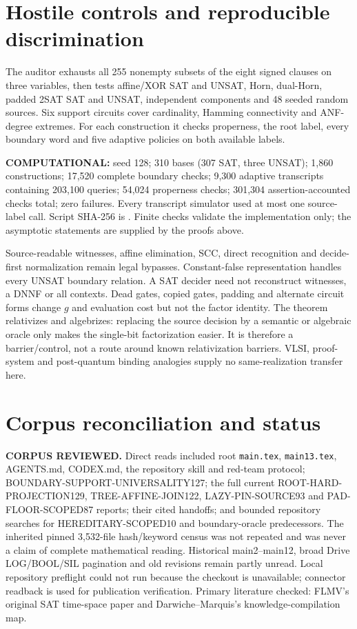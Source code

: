 \documentclass[11pt]{article}
\begin{document}
\section{Hostile controls and reproducible discrimination}
The auditor exhausts all 255 nonempty subsets of the eight signed clauses on
three variables, then tests affine/XOR SAT and UNSAT, Horn, dual-Horn,
padded 2SAT SAT and UNSAT, independent components and 48 seeded random
sources.  Six support circuits cover cardinality, Hamming connectivity and
ANF-degree extremes.  For each construction it checks properness, the root
label, every boundary word and five adaptive policies on both available
labels.

\textbf{COMPUTATIONAL:} seed 128; 310 bases (307 SAT, three UNSAT); 1,860
constructions; 17,520 complete boundary checks; 9,300 adaptive transcripts
containing 203,100 queries; 54,024 properness checks; 301,304
assertion-accounted checks total; zero failures.  Every transcript simulator
used at most one source-label call.  Script SHA-256 is
.
Finite checks validate the implementation only; the asymptotic statements
are supplied by the proofs above.

Source-readable witnesses, affine elimination, SCC, direct recognition and
decide-first normalization remain legal bypasses.  Constant-false
representation handles every UNSAT boundary relation.  A SAT decider need
not reconstruct witnesses, a DNNF or all contexts.  Dead gates, copied gates,
padding and alternate circuit forms change $g$ and evaluation cost but not
the factor identity.  The theorem relativizes and algebrizes: replacing the
source decision by a semantic or algebraic oracle only makes the single-bit
factorization easier.  It is therefore a barrier/control, not a route around
known relativization barriers.  VLSI, proof-system and post-quantum binding
analogies supply no same-realization transfer here.

\section{Corpus reconciliation and status}
\textbf{CORPUS REVIEWED.}  Direct reads included root \texttt{main.tex},
\texttt{main13.tex}, AGENTS.md, CODEX.md, the repository skill and red-team
protocol; BOUNDARY-SUPPORT-UNIVERSALITY127; the full current
ROOT-HARD-PROJECTION129, TREE-AFFINE-JOIN122, LAZY-PIN-SOURCE93 and
PAD-FLOOR-SCOPED87 reports; their cited handoffs; and bounded repository
searches for HEREDITARY-SCOPED10 and boundary-oracle predecessors.  The
inherited pinned 3,532-file hash/keyword census was not repeated and was
never a claim of complete mathematical reading.  Historical main2--main12,
broad Drive LOG/BOOL/SIL pagination and old revisions remain partly unread.
Local repository preflight could not run because the checkout is unavailable;
connector readback is used for publication verification.  Primary literature
checked: FLMV's original SAT time-space paper and Darwiche--Marquis's
knowledge-compilation map.
\end{document}

